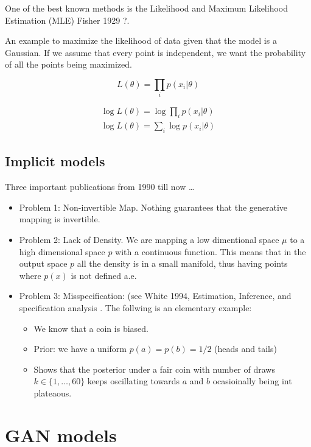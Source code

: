 \documentclass[b5paper]{report}
\begin{document}
One of the best known methods is the Likelihood and Maximum Likelihood
Estimation (MLE) Fisher 1929 \cite{fisher1929tests}?.

An example to maximize the likelihood of data given that the model is a
Gaussian. If we assume that every point is independent, we want the probability
of all the points being maximized.

\begin{equation}
  L(\theta) = \prod_i p(x_i|\theta)
\end{equation}

\begin{align}
  \log L(\theta) = \log \prod_i p(x_i|\theta) \\
  \log L(\theta) = \sum_i \log p(x_i|\theta)
\end{align}

\subsection{Implicit models}

Three important publications from 1990 till now \dots

\begin{itemize}
  \item Problem 1: Non-invertible Map. Nothing guarantees that the generative
    mapping is invertible.
  \item Problem 2: Lack of Density. We are mapping a low dimentional space
    $\mu$ to a high dimensional space $p$ with a continuous function. This
    means that in the output space $p$ all the density is in a small manifold,
    thus having points where $p(x)$ is not defined a.e.
  \item Problem 3: Misspecification: (see White 1994, Estimation, Inference,
      and specification analysis \cite{white1996estimation}. The follwing is an
      elementary example:
      \begin{itemize}
        \item We know that a coin is biased.
        \item Prior: we have a uniform $p(a) = p(b) = 1/2$ (heads and tails)
        \item Shows that the posterior under a fair coin with number of draws
          $k \in \{1,\dots,60\}$ keeps oscillating towards $a$ and  $b$
          ocasioinally being int plateaous.
      \end{itemize}
\end{itemize}

\section{GAN models}
\end{document}
